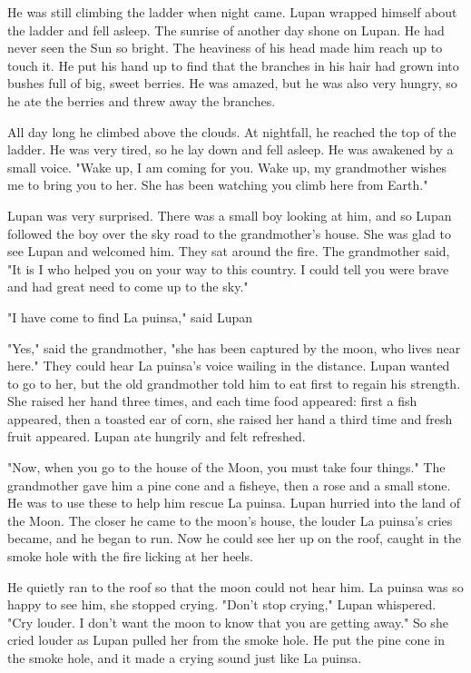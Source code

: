 He was still climbing the ladder when night came. Lupan wrapped himself about the ladder and fell asleep. The sunrise of another day shone on Lupan. He had never seen the Sun so bright. The heaviness of his head made him reach up to touch it. He put his hand up to find that the branches in his hair had grown into bushes full of big, sweet berries. He was amazed, but he was also very hungry, so he ate the berries and threw away the branches.

All day long he climbed above the clouds. At nightfall, he reached the top of the ladder. He was very tired, so he lay down and fell asleep. He was awakened by a small voice. "Wake up, I am coming for you. Wake up, my grandmother wishes me to bring you to her. She has been watching you climb here from Earth."

Lupan was very surprised. There was a small boy looking at him, and so Lupan followed the boy over the sky road to the grandmother's house. She was glad to see Lupan and welcomed him. They sat around the fire. The grandmother said, "It is I who helped you on your way to this country. I could tell you were brave and had great need to come up to the sky."

"I have come to find La puinsa," said Lupan

"Yes," said the grandmother, "she has been captured by the moon, who lives near here." They could hear La puinsa's voice wailing in the distance. Lupan wanted to go to her, but the old grandmother told him to eat first to regain his strength. She raised her hand three times, and each time food appeared: first a fish appeared, then a toasted ear of corn, she raised her hand a third time and fresh fruit appeared. Lupan ate hungrily and felt refreshed.

"Now, when you go to the house of the Moon, you must take four things." The grandmother gave him a pine cone and a fisheye, then a rose and a small stone. He was to use these to help him rescue La puinsa. Lupan hurried into the land of the Moon. The closer he came to the moon's house, the louder La puinsa's cries became, and he began to run. Now he could see her up on the roof, caught in the smoke hole with the fire licking at her heels.

He quietly ran to the roof so that the moon could not hear him. La puinsa was so happy to see him, she stopped crying. "Don't stop crying," Lupan whispered. "Cry louder. I don't want the moon to know that you are getting away." So she cried louder as Lupan pulled her from the smoke hole. He put the pine cone in the smoke hole, and it made a crying sound just like La puinsa.

